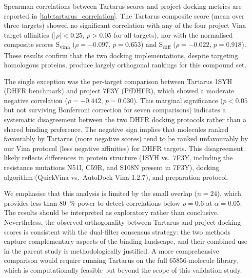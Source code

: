 \documentclass[11pt,a4paper]{article}
\begin{document}
Spearman correlations between Tartarus scores and project docking metrics are reported in \cref{tab:tartarus_correlation}. The Tartarus composite score (mean over three targets) showed no significant correlation with any of the four project Vina target affinities ($|\rho| < 0.25$, $p > 0.05$ for all targets), nor with the normalised composite scores S\textsubscript{vina} ($\rho = -0.097$, $p = 0.653$) and S\textsubscript{diff} ($\rho = -0.022$, $p = 0.918$). These results confirm that the two docking implementations, despite targeting homologous proteins, produce largely orthogonal rankings for this compound set.

The single exception was the per-target comparison between Tartarus 1SYH (DHFR benchmark) and project 7F3Y (PfDHFR), which showed a moderate negative correlation ($\rho = -0.442$, $p = 0.030$). This marginal significance ($p < 0.05$ but not surviving Bonferroni correction for seven comparisons) indicates a systematic disagreement between the two DHFR docking protocols rather than a shared binding preference. The negative sign implies that molecules ranked favourably by Tartarus (more negative scores) tend to be ranked unfavourably by our Vina protocol (less negative affinities) for DHFR targets. This disagreement likely reflects differences in protein structure (1SYH vs.~7F3Y, including the resistance mutations N51I, C59R, and S108N present in 7F3Y), docking algorithm (QuickVina vs.~AutoDock Vina 1.2.7), and preparation protocol.

We emphasise that this analysis is limited by the small overlap ($n = 24$), which provides less than \qty{80}{\percent} power to detect correlations below $\rho = 0.6$ at $\alpha = 0.05$. The results should be interpreted as exploratory rather than conclusive. Nevertheless, the observed orthogonality between Tartarus and project docking scores is consistent with the dual-filter consensus strategy: the two methods capture complementary aspects of the binding landscape, and their combined use in the parent study \citep{temgoua2026antimalarial} is methodologically justified. A more comprehensive comparison would require running Tartarus on the full \num{65856}-molecule library, which is computationally feasible but beyond the scope of this validation study.
\end{document}
